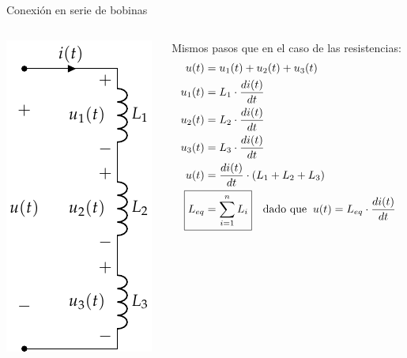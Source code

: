 \documentclass[aspectratio=169, xcolor={usenames,svgnames,dvipsnames}]{beamer}
\begin{document}

\begin{frame}{Conexión en serie de bobinas} \label{diapo:bobinas_serie}
    \begin{columns}
    \begin{column}{0.3\columnwidth}
    \begin{center}
    \includegraphics[height=0.85\textheight]{../figs/BobinasSerie.pdf}
    \end{center}
    \end{column}
    \begin{column}{0.7\columnwidth}
    Mismos pasos que en el caso de las resistencias:
    \begin{align*}
      u(t) & = u_1(t) + u_2(t) + u_3(t)\\
      u_1(t) &= L_1 \cdot \frac{di(t)}{dt}\\
      u_2(t) &= L_2 \cdot \frac{di(t)}{dt}\\
      u_3(t) &= L_3 \cdot \frac{di(t)}{dt}\\
      u(t)& = \frac{di(t)}{dt} \cdot (L_1 + L_2 + L_3)\\
      \Aboxed{L_{eq} &= \sum_{i = 1}^n L_i} \quad \textrm{dado que} \;\; u(t) = L_{eq} \cdot \frac{di(t)}{dt}
    \end{align*}
    \end{column}
    \end{columns}
\end{frame}

\end{document}

